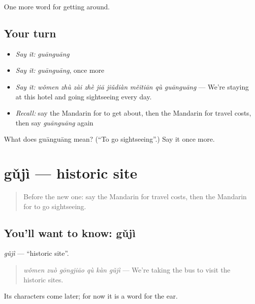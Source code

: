 \begin{grammarlens}[title={What you've built}]
One more word for getting around.
\end{grammarlens}

\subsection*{Your turn}
\begin{itemize}
\raggedright
  \item \emph{Say it:} \emph{guānguāng}
  \item \emph{Say it:} \emph{guānguāng}, once more
  \item \emph{Say it:} \emph{wǒmen zhù zài zhè jiā jiǔdiàn měitiān qù guānguāng} — We're staying at this hotel and going sightseeing every day.
  \item \emph{Recall:} say the Mandarin for to get about, then the Mandarin for travel costs, then say \emph{guānguāng} again
\end{itemize}

\begin{tcolorbox}[breakable,colback=teal!4,colframe=teal!35!black,title={Before you move on}]
What does guānguāng mean? (\textquotedblleft{}To go sightseeing\textquotedblright{}.) Say it once more.
\end{tcolorbox}
\section[gǔjì]{gǔjì — historic site}

\label{lesson:ZH-C430-guji}



\begin{quote}
Before the new one: say the Mandarin for travel costs, then the Mandarin for to go sightseeing.
\end{quote}

\subsection*{You'll want to know: gǔjì}
\emph{gǔjì} — \textquotedblleft{}historic site\textquotedblright{}.

\begin{quote}
\emph{wǒmen zuò gōngjiāo qù kàn gǔjì} — We're taking the bus to visit the historic sites.
\end{quote}

Its characters come later; for now it is a word for the ear.

